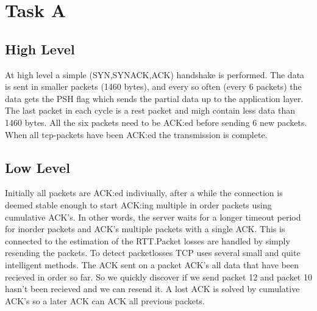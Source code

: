 \documentclass[10pt]{article}
\begin{document}
\section{Task A} \subsection{High Level} At high level a simple (SYN,SYNACK,ACK)
handshake is performed. The data is sent in smaller packets (1460 bytes), and
every so often (every 6 packets) the data gets the PSH flag which sends the
partial data up to the application layer. The last packet in each cycle is a
rest packet and migh contain less data than 1460 bytes. All the six packets need
to be ACK:ed before sending 6 new packets. When all tcp-packets have been ACK:ed
the transmission is complete. \subsection{Low Level} Initially all packets are
ACK:ed indiviually, after a while the connection is deemed stable enough to
start ACK:ing multiple in order packets using cumulative ACK's. In other words,
the server waits for a longer timeout period for inorder packets and ACK's
multiple packets with a single ACK. This is connected to the estimation of the
RTT.Packet losses are handled by simply resending the packets. To detect
packetlosses TCP uses several small and quite intelligent methods. The ACK sent
on a packet ACK's all data that have been recieved in order so far. So we
quickly discover if we send packet 12 and packet 10 hasn't been recieved and we
can resend it. A lost ACK is solved by cumulative ACK's so a later ACK can ACK
all previous packets.
\end{document}
